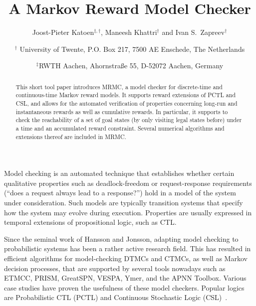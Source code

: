 \documentclass[times, 10pt,twocolumn]{article}
\begin{document}


\title{A Markov Reward Model Checker}
\author{
   Joost-Pieter Katoen{$^{\ddagger,\dagger}$},
   Maneesh Khattri{$^{\dagger}$}
   and Ivan S.\ Zapreev{$^{\dagger}$}
   \and
   {$^{\dagger}$}
   \small{University of Twente, P.O. Box 217, 7500 AE Enschede, 
           The Netherlands}\\
   \and
   {$^{\ddagger}$}\small{RWTH Aachen, Ahornstra\ss e 55, D-52072 Aachen, 
           Germany}
}

\maketitle
\thispagestyle{empty}

\begin{abstract}
This short tool paper introduces MRMC, a model checker for discrete-time
and continuous-time Markov reward models.
It supports reward extensions of PCTL and CSL, and allows for the automated
verification of properties concerning long-run and instantaneous rewards
as well as cumulative rewards.
In particular, it supports to check the reachability of a set of goal 
states (by only visiting legal states before) under a time and an accumulated 
reward constraint. 
Several numerical algorithms and extensions thereof are included in MRMC.
\end{abstract}



Model checking is an automated technique that establishes whether certain 
qualitative properties such as deadlock-freedom or request-response 
requirements (``does a request always lead to a response?'') hold in a
model of the system under consideration.
Such models are typically transition systems that specify how the system
may evolve during execution.
Properties are usually expressed in temporal extensions of propositional
logic, such as CTL.

Since the seminal work of Hansson and Jonsson, adapting model checking to 
probabilistic systems has been a rather active research field.
This has resulted in efficient algorithms for model-checking DTMCs and 
CTMCs, as well as Markov decision processes, that are supported by several
tools nowadays such as ETMCC, PRISM, GreatSPN, VESPA, Ymer, and the APNN
Toolbox.
Various case studies have proven the usefulness of these model checkers.
Popular logics are Probabilistic CTL (PCTL) and Continuous Stochastic
Logic (CSL)~\cite{BaierHHK_TSE03}.
\end{document}
